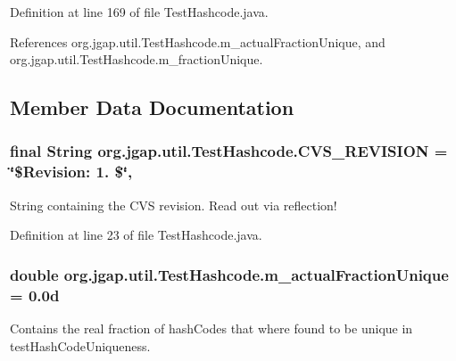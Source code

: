 Definition at line 169 of file Test\-Hashcode.\-java.



References org.\-jgap.\-util.\-Test\-Hashcode.\-m\-\_\-actual\-Fraction\-Unique, and org.\-jgap.\-util.\-Test\-Hashcode.\-m\-\_\-fraction\-Unique.



\subsection{Member Data Documentation}
\hypertarget{classorg_1_1jgap_1_1util_1_1_test_hashcode_a4888cc10337eb1d4c0225c7f0ff2d7ed}{
\subsubsection[{C\-V\-S\-\_\-\-R\-E\-V\-I\-S\-I\-O\-N}]{\setlength{\rightskip}{0pt plus 5cm}final String org.\-jgap.\-util.\-Test\-Hashcode.\-C\-V\-S\-\_\-\-R\-E\-V\-I\-S\-I\-O\-N = \char`\"{}\$Revision\-: 1. \$\char`\"{}\hspace{0.3cm}{\ttfamily [static]}, {\ttfamily [private]}}}\label{classorg_1_1jgap_1_1util_1_1_test_hashcode_a4888cc10337eb1d4c0225c7f0ff2d7ed}
String containing the C\-V\-S revision. Read out via reflection! 

Definition at line 23 of file Test\-Hashcode.\-java.

\hypertarget{classorg_1_1jgap_1_1util_1_1_test_hashcode_a50fe2fcbfefbc22be87b0f486e00dd09}{
\subsubsection[{m\-\_\-actual\-Fraction\-Unique}]{\setlength{\rightskip}{0pt plus 5cm}double org.\-jgap.\-util.\-Test\-Hashcode.\-m\-\_\-actual\-Fraction\-Unique = 0.\-0d\hspace{0.3cm}{\ttfamily [private]}}}\label{classorg_1_1jgap_1_1util_1_1_test_hashcode_a50fe2fcbfefbc22be87b0f486e00dd09}
Contains the real fraction of hash\-Codes that where found to be unique in test\-Hash\-Code\-Uniqueness. 

